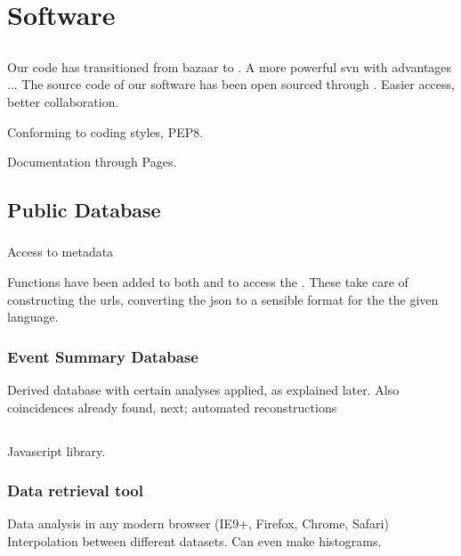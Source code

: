 \chapter{Software}
\label{ch:software}

\section{\github}

Our code has transitioned from bazaar to \git. A more powerful svn with
advantages ... The source code of our software has been open sourced
through \github. Easier access, better collaboration.

Conforming to coding styles, PEP8.

Documentation through \github Pages.


\section{\hisparc Public Database}

\subsection{\api}

Access to metadata

Functions have been added to both \sapphire and \jsparc to access the
\api. These take care of constructing the urls, converting the json to a
sensible format for the the given language.


\subsection{Event Summary Database}

Derived database with certain analyses applied, as explained later. Also
coincidences already found, next; automated reconstructions


\section{\jsparc}

Javascript library.


\subsection{Data retrieval tool}

Data analysis in any modern browser (IE9+, Firefox, Chrome, Safari)
Interpolation between different datasets. Can even make histograms.

